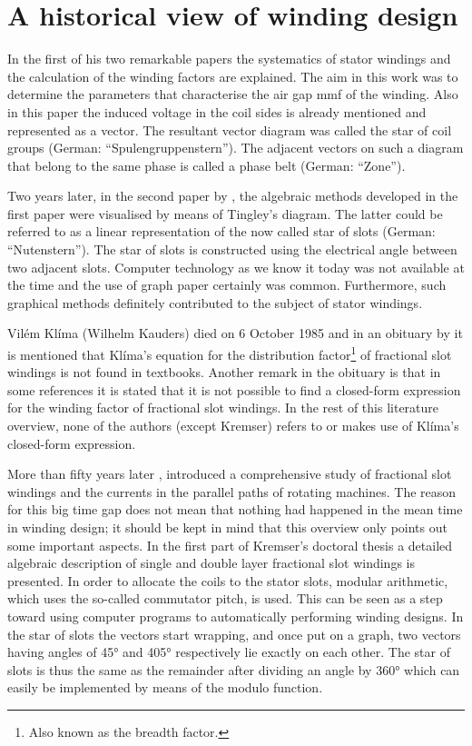 \chapter{A historical view of winding design}
In the first of his two remarkable papers \cite{REF-00835, REF-00836} the systematics of stator windings and the calculation of the winding factors are explained. The aim in this work was to determine the parameters that characterise the air gap mmf of the winding. Also in this paper the induced voltage in the coil sides is already mentioned and represented as a vector. The resultant vector diagram was called the star of coil groups (German: ``Spulengruppenstern''). The adjacent vectors on such a diagram that belong to the same phase is called a phase belt (German: ``Zone'').

Two years later, in the second paper by \cite{REF-00837}, the algebraic methods developed in the first paper were visualised by means of Tingley's diagram. The latter could be referred to as a linear representation of the now called star of slots (German: ``Nutenstern''). The star of slots is constructed using the electrical angle between two adjacent slots. Computer technology as we know it today was not available at the time and the use of graph paper certainly was common. Furthermore, such graphical methods definitely contributed to the subject of stator windings.

Vil\'em Kl\'ima (Wilhelm Kauders) died on 6 October 1985 and in an obituary by \cite{REF-01054} it is mentioned that Kl\'ima's equation for the distribution factor\footnote{Also known as the breadth factor.} of fractional slot windings is not found in textbooks. Another remark in the obituary is that in some references it is stated that it is not possible to find a closed-form expression for the winding factor of fractional slot windings. In the rest of this literature overview, none of the authors (except Kremser) refers to or makes use of Kl\'ima's closed-form expression. 

More than fifty years later \cite{REF-00837}, \cite{REF-00266} introduced a comprehensive study of fractional slot windings and the currents in the parallel paths of rotating machines. The reason for this big time gap does not mean that nothing had happened in the mean time in winding design; it should be kept in mind that this overview only points out some important aspects. In the first part of Kremser's doctoral thesis a detailed algebraic description of single and double layer fractional slot windings is presented. In order to allocate the coils to the stator slots, modular arithmetic, which uses the so-called commutator pitch, is used. This can be seen as a step toward using computer programs to automatically performing winding designs. In the star of slots the vectors start wrapping, and once put on a graph, two vectors having angles of \ang{45} and \ang{405} respectively lie exactly on each other. The star of slots is thus the same as the remainder after dividing an angle by \ang{360} which can easily be implemented by means of the modulo function.  

